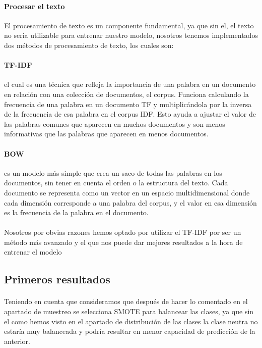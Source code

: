 \documentclass{report}
\begin{document}
{                \paragraph*{Procesar el texto}{
                    El procesamiento de texto es un componente fundamental, ya que sin el, el texto no seria utilizable para entrenar nuestro modelo, nosotros tenemos implementados dos métodos de procesamiento de texto, los cuales son:
                }
                \paragraph*{TF-IDF}{
                      el cual es una técnica que refleja la importancia de una palabra en un documento en relación con una colección de documentos, el corpus. Funciona calculando la frecuencia de una palabra en un documento TF y multiplicándola por la inversa de la frecuencia de esa palabra en el corpus IDF. Esto ayuda a ajustar el valor de las palabras comunes que aparecen en muchos documentos y son menos informativas que las palabras que aparecen en menos documentos.
                }
                \paragraph*{BOW}{
                     es un modelo más simple que crea un saco de todas las palabras en los documentos, sin tener en cuenta el orden o la estructura del texto. Cada documento se representa como un vector en un espacio multidimensional donde cada dimensión corresponde a una palabra del corpus, y el valor en esa dimensión es la frecuencia de la palabra en el documento.
                }
                \paragraph*{}{
                    Nosotros por obvias razones hemos optado por utilizar el TF-IDF por ser un método más avanzado y el que nos puede dar mejores resultados a la hora de entrenar el modelo
                }    
            \clearpage\subsection{Primeros resultados}
                \paragraph*{}{
                Teniendo en cuenta que consideramos que después de hacer lo comentado en el apartado de muestreo se selecciona SMOTE para balancear las clases, ya que sin el como hemos visto en el apartado de distribución de las clases la clase neutra no estaría muy balanceada y podría resultar en menor capacidad de predicción de la anterior.
                }
}
\end{document}
